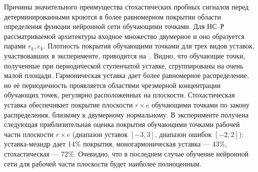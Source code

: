 Причины значительного преимущества стохастических пробных сигналов
перед детерминированными кроются в более равномерном покрытии области
определения функции нейронной сети обучающими точками.  Для НС--Р
рассматриваемой архитектуры входное множество двумерное и оно
образуется парами $r_k,e_k$.  Плотность покрытия обучающими точками
для трех видов уставок, участвовавших в эксперименте, приводится
на~.  Видно, что обучающие точки,
полученные при периодической ступенчатой уставке, сгруппированы на
очень малой площади.  Гармоническая уставка дает более равномерное
распределение, но её периодичность проявляется областями чрезмерной
концентрации обучающих точек, регулярно расположенных на плоскости.
Стохастическая уставка обеспечивает покрытие плоскости $r\times e$
обучающими точками по закону распределения, близкому к двумерному
нормальному.  В эксперименте получена следующая приблизительная оценка
покрытия обучающими точками рабочей части плоскости $r\times e$
(диапазон уставок $[-3,3]$, диапазон ошибок $[-2,2]$): уставка-меандр
дает 14\% покрытия, моногармоническая уставка --- 43\%, стохастическая
--- 72\%.  Очевидно, что в последнем случае обучение нейронной сети
для рабочей части плоскости будет наиболее полноценным.

